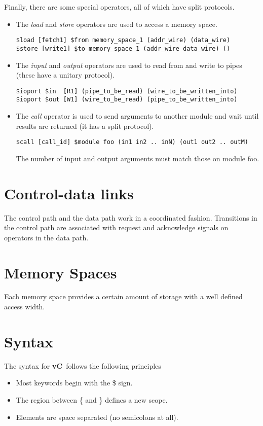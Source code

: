 \documentclass{article}
\newcommand{\vC}{{\bf vC}~}
\begin{document}
Finally, there are some special operators, all
of which have split protocols.
\begin{itemize}
\item The {\em load} and {\em store} operators are used to access
a memory space.
\begin{verbatim}
$load [fetch1] $from memory_space_1 (addr_wire) (data_wire)
$store [write1] $to memory_space_1 (addr_wire data_wire) ()
\end{verbatim}
\item The {\em input} and {\em output} operators are used
to read from and write to pipes (these have a unitary protocol).
\begin{verbatim}
$ioport $in  [R1] (pipe_to_be_read) (wire_to_be_written_into)
$ioport $out [W1] (wire_to_be_read) (pipe_to_be_written_into)
\end{verbatim}
\item The {\em call} operator is used to send arguments to
another module and wait until results are returned (it has
a split protocol).
\begin{verbatim}
$call [call_id] $module foo (in1 in2 .. inN) (out1 out2 .. outM)
\end{verbatim}
The number of input and output arguments must match those
on module foo.
\end{itemize}

\section{Control-data links} 

The control path and the data path work in
a coordinated fashion.  Transitions in the control
path are associated with request and acknowledge
signals on operators in the data path.  %

\section{Memory Spaces}

Each memory space provides a certain amount of 
storage with a well defined access width.  %

\section{Syntax} \label{sec:Syntax}

The syntax for \vC follows the following
principles
\begin{itemize}
\item Most keywords begin with the \$ sign.
\item The region between \{ and \} defines a new scope.
\item Elements are space separated (no semicolons at all).
\end{itemize}
\end{document}
